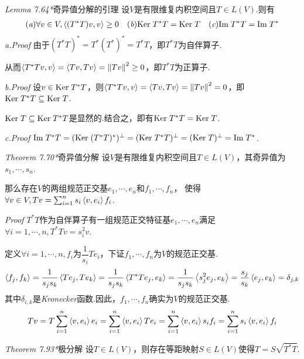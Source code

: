 \textit{Lemma 7.64*}{\kaishu 奇异值分解的引理}
设\(V\)是有限维复内积空间且\(T \in L(V)\).则有
    \begin{align*}
        (\textit{a})\forall v \in V,\left\langle (T^*T)v,v \right\rangle \geq 0 \quad
        (\textit{b})\mathrm{Ker \;} T^*T=\mathrm{Ker \;} T \quad (\textit{c})\mathrm{Im \;} T^*T=\mathrm{Im \;} T^*
    \end{align*}
\textit{a.Proof}
由于\((T^*T)^*=T^*(T^*)^*=T^*T\)，即\(T^*T\)为自伴算子.

从而\(\left\langle T^*Tv,v \right\rangle=\left\langle Tv,Tv \right\rangle=\left\lVert Tv \right\rVert^2 \geq 0\)，即\(T^*T\)为正算子.

\textit{b.Proof}
设\(v \in \mathrm{Ker \;} T^*T\)，则\(\left\langle T^*Tv,v \right\rangle=\left\langle Tv,Tv \right\rangle=\left\lVert Tv \right\rVert^2=0\)，即\(\mathrm{Ker \;} T^*T \subseteq \mathrm{Ker \;} T\).

\(\mathrm{Ker \;} T \subseteq \mathrm{Ker \;} T^*T\)是显然的.结合之，即有\(\mathrm{Ker \;} T^*T=\mathrm{Ker \;} T\).

\textit{c.Proof}
\(\mathrm{Im \;} T^*T=(\mathrm{Ker \;} (T^*T)^*)^\bot=(\mathrm{Ker \;} T^*T)^\bot=(\mathrm{Ker \;} T)^\bot=\mathrm{Im \;} T^*\).

\hspace*{\fill}

\textit{Theorem 7.70*}{\kaishu 奇异值分解}
设\(V\)是有限维复内积空间且\(T \in L(V)\)，其奇异值为\(s_1,\cdots,s_n\).

那么存在\(V\)的两组规范正交基\(e_1,\cdots,e_n\)和\(f_1,\cdots,f_n\)，
使得\(\forall v \in V,Tv=\sum_{i=1}^n s_i\left\langle v,e_i \right\rangle f_i\).

\textit{Proof}
\(T^*T\)作为自伴算子有一组规范正交特征基\(e_1,\cdots,e_n\)满足\(\forall i=1,\cdots,n,T^*Tv=s_i^2 v\).

定义\(\forall i=1,\cdots,n,f_i\)为\(\dfrac{1}{s_i}Te_i\)，下证\(f_1,\cdots,f_n\)为\(V\)的规范正交基.
    \begin{align*}
        \left\langle f_j,f_k \right\rangle=\dfrac{1}{s_js_k}\left\langle Te_j,Te_k \right\rangle=\dfrac{1}{s_js_k}\left\langle T^*Te_j,e_k \right\rangle
        =\dfrac{1}{s_js_k}\left\langle s_j^2 e_j,e_k \right\rangle=\dfrac{s_j}{s_k}\left\langle e_j,e_k \right\rangle=\delta_{j,k}
    \end{align*}
其中\(\delta_{i,k}\)是\textit{Kronecker}函数.因此，\(f_1,\cdots,f_n\)确实为\(V\)的规范正交基.
    \begin{align*}
        Tv=T\sum_{i=1}^n \left\langle v,e_i \right\rangle e_i=\sum_{i=1}^n \left\langle v,e_i \right\rangle Te_i
        =\sum_{i=1}^n \left\langle v,e_i \right\rangle s_if_i=\sum_{i=1}^n s_i\left\langle v,e_i \right\rangle f_i
    \end{align*}

\hspace*{\fill}

\textit{Theorem 7.93*}{\kaishu 极分解}
设\(T \in L(V)\)，则存在等距映射\(S \in L(V)\)使得\(T=S\sqrt{T^*T}\).

